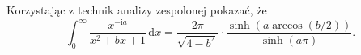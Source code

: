 %

\begin{problem}[pytanie 2529614]
    Korzystając z technik analizy zespolonej pokazać, że
    \label{stack_2529614}%
    \begin{equation}
        \int_0^\infty \frac{x^{-\mathrm{i}a}}{x^2+bx+1} \,\mathrm{d}x = \frac{2\pi}{\sqrt{4-b^2}} \cdot \frac{\sinh (a \arccos (b/2))}{\sinh (a \pi)}.
    \end{equation}
\end{problem}

%